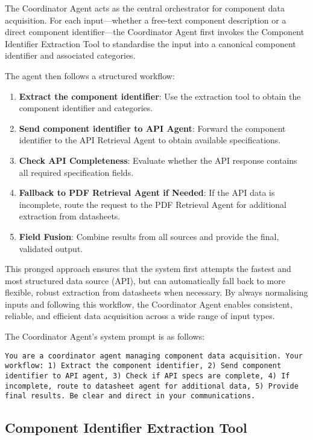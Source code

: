 The Coordinator Agent acts as the central orchestrator for component data acquisition. For each input—whether a free-text component description or a direct component identifier—the Coordinator Agent first invokes the Component Identifier Extraction Tool to standardise the input into a canonical component identifier and associated categories. 

The agent then follows a structured workflow:
\begin{enumerate}
    \item \textbf{Extract the component identifier}: Use the extraction tool to obtain the component identifier and categories.
    \item \textbf{Send component identifier to API Agent}: Forward the component identifier to the API Retrieval Agent to obtain available specifications.
    \item \textbf{Check API Completeness}: Evaluate whether the API response contains all required specification fields.
    \item \textbf{Fallback to PDF Retrieval Agent if Needed}: If the API data is incomplete, route the request to the PDF Retrieval Agent for additional extraction from datasheets.
    \item \textbf{Field Fusion}: Combine results from all sources and provide the final, validated output.
\end{enumerate}

This pronged approach ensures that the system first attempts the fastest and most structured data source (API), but can automatically fall back to more flexible, robust extraction from datasheets when necessary. By always normalising inputs and following this workflow, the Coordinator Agent enables consistent, reliable, and efficient data acquisition across a wide range of input types.

The Coordinator Agent's system prompt is as follows:
\begin{lstlisting}[caption={System prompt for the Coordinator Agent.}, label={lst:coordinator_prompt}, breaklines=true]
You are a coordinator agent managing component data acquisition. Your workflow: 1) Extract the component identifier, 2) Send component identifier to API agent, 3) Check if API specs are complete, 4) If incomplete, route to datasheet agent for additional data, 5) Provide final results. Be clear and direct in your communications.
\end{lstlisting}

\subsection{Component Identifier Extraction Tool}

